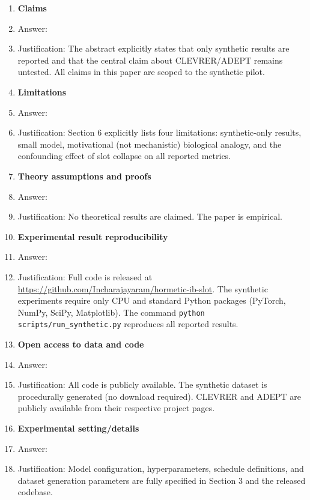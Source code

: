 \documentclass{article}
\begin{document}
\begin{enumerate}

\item {\bf Claims}
    \item[] Answer: \answerYes{}
    \item[] Justification: The abstract explicitly states that only synthetic results
    are reported and that the central claim about CLEVRER/ADEPT remains untested.
    All claims in this paper are scoped to the synthetic pilot.

\item {\bf Limitations}
    \item[] Answer: \answerYes{}
    \item[] Justification: Section 6 explicitly lists four limitations: synthetic-only
    results, small model, motivational (not mechanistic) biological analogy, and
    the confounding effect of slot collapse on all reported metrics.

\item {\bf Theory assumptions and proofs}
    \item[] Answer: \answerNA{}
    \item[] Justification: No theoretical results are claimed. The paper is empirical.

    \item {\bf Experimental result reproducibility}
    \item[] Answer: \answerYes{}
    \item[] Justification: Full code is released at
    \url{https://github.com/Incharajayaram/hormetic-ib-slot}.
    The synthetic experiments require only CPU and standard Python packages
    (PyTorch, NumPy, SciPy, Matplotlib). The command \texttt{python scripts/run\_synthetic.py}
    reproduces all reported results.

\item {\bf Open access to data and code}
    \item[] Answer: \answerYes{}
    \item[] Justification: All code is publicly available. The synthetic dataset is
    procedurally generated (no download required). CLEVRER and ADEPT are publicly
    available from their respective project pages.

\item {\bf Experimental setting/details}
    \item[] Answer: \answerYes{}
    \item[] Justification: Model configuration, hyperparameters, schedule definitions,
    and dataset generation parameters are fully specified in Section 3 and the
    released codebase.


\end{enumerate}
\end{document}
